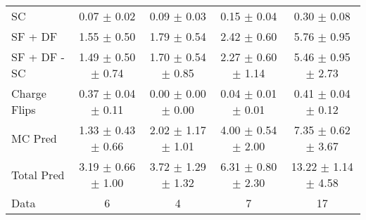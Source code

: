 \begin{tabular}{l|cccc}
                                 SC &  0.07 $\pm$  0.02 &  0.09 $\pm$  0.03 &  0.15 $\pm$  0.04 &  0.30 $\pm$  0.08 \\
                            SF + DF &  1.55 $\pm$  0.50 &  1.79 $\pm$  0.54 &  2.42 $\pm$  0.60 &  5.76 $\pm$  0.95 \\
\hline
                       SF + DF - SC &  1.49 $\pm$  0.50 $\pm$  0.74 &  1.70 $\pm$  0.54 $\pm$  0.85 &  2.27 $\pm$  0.60 $\pm$  1.14 &  5.46 $\pm$  0.95 $\pm$  2.73 \\
\hline\hline
                       Charge Flips &  0.37 $\pm$  0.04 $\pm$  0.11 &  0.00 $\pm$  0.00 $\pm$  0.00 &  0.04 $\pm$  0.01 $\pm$  0.01 &  0.41 $\pm$  0.04 $\pm$  0.12 \\
\hline
                            MC Pred &  1.33 $\pm$  0.43 $\pm$  0.66 &  2.02 $\pm$  1.17 $\pm$  1.01 &  4.00 $\pm$  0.54 $\pm$  2.00 &  7.35 $\pm$  0.62 $\pm$  3.67 \\
\hline
                         Total Pred &  3.19 $\pm$  0.66 $\pm$  1.00 &  3.72 $\pm$  1.29 $\pm$  1.32 &  6.31 $\pm$  0.80 $\pm$  2.30 & 13.22 $\pm$  1.14 $\pm$  4.58 \\
\hline\hline
                               Data &     6 &     4 &     7 &    17 \\
\hline\hline
\end{tabular}

